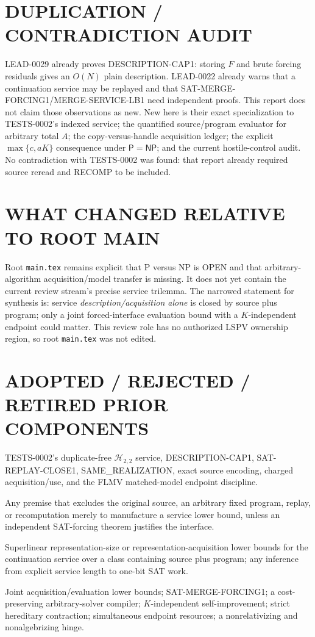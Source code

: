 \documentclass[11pt]{article}
\newcommand{\Pclass}{\mathsf P}
\newcommand{\NPclass}{\mathsf{NP}}
\begin{document}
\section{DUPLICATION / CONTRADICTION AUDIT}
LEAD-0029 already proves \textsf{DESCRIPTION-CAP1}: storing $F$ and brute
forcing residuals gives an $O(N)$ plain description.  LEAD-0022 already warns
that a continuation service may be replayed and that
\textsf{SAT-MERGE-FORCING1}/\textsf{MERGE-SERVICE-LB1} need independent
proofs.  This report does not claim those observations as new.  New here is
their exact specialization to TESTS-0002's indexed service; the quantified
source/program evaluator for arbitrary total $A$; the copy-versus-handle
acquisition ledger; the explicit $\max\{c,aK\}$ consequence under
$\Pclass=\NPclass$; and the current hostile-control audit.  No contradiction
with TESTS-0002 was found: that report already required source reread and
RECOMP to be included.

\section{WHAT CHANGED RELATIVE TO ROOT MAIN}
Root \texttt{main.tex} remains explicit that P versus NP is OPEN and that
arbitrary-algorithm acquisition/model transfer is missing.  It does not yet
contain the current review stream's precise service trilemma.  The narrowed
statement for synthesis is: service \emph{description/acquisition alone} is
closed by source plus program; only a joint forced-interface evaluation bound
with a $K$-independent endpoint could matter.  This review role has no
authorized LSPV ownership region, so root \texttt{main.tex} was not edited.

\section{ADOPTED / REJECTED / RETIRED PRIOR COMPONENTS}
\begin{description}[leftmargin=2.8cm,style=nextline]
\item[ADOPTED.] TESTS-0002's duplicate-free $\mathcal H_{2,2}$ service,
DESCRIPTION-CAP1, SAT-REPLAY-CLOSE1, SAME\_REALIZATION, exact source encoding,
charged acquisition/use, and the FLMV matched-model endpoint discipline.
\item[REJECTED.] Any premise that excludes the original source, an arbitrary
fixed program, replay, or recomputation merely to manufacture a service lower
bound, unless an independent SAT-forcing theorem justifies the interface.
\item[FALSIFIED/RETIRED.] Superlinear representation-size or
representation-acquisition lower bounds for the continuation service over a
class containing source plus program; any inference from explicit service
length to one-bit SAT work.
\item[OPEN.] Joint acquisition/evaluation lower bounds; SAT-MERGE-FORCING1;
a cost-preserving arbitrary-solver compiler; $K$-independent self-improvement;
strict hereditary contraction; simultaneous endpoint resources; a
nonrelativizing and nonalgebrizing hinge.
\end{description}
\end{document}
